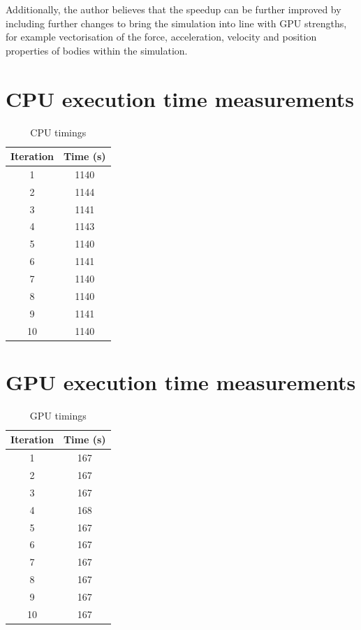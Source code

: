 \documentclass[journal,transmag]{IEEEtran}
\begin{document}
    Additionally, the author believes that the speedup can be further improved by including further changes to bring the
    simulation into line with GPU strengths, for example vectorisation of the force, acceleration, velocity and position
    properties of bodies within the simulation.

    \newpage

    \appendices
    \section{CPU execution time measurements}
    \begin{table}[h]
        \centering
        \caption{CPU timings}
        \label{CPUTableRaw}
        \begin{tabular}{ c c }
            Iteration & Time (s) \\
            \hline
            \hline
            1         & 1140 \\
            2         & 1144 \\
            3         & 1141 \\
            4         & 1143 \\
            5         & 1140 \\
            6         & 1141 \\
            7         & 1140 \\
            8         & 1140 \\
            9         & 1141 \\
            10        & 1140 \\
        \end{tabular}
    \end{table}

    \section{GPU execution time measurements}
     \begin{table}[h]
        \centering
        \caption{GPU timings}
        \label{GPUTableRaw}
        \begin{tabular}{ c c }
            Iteration & Time (s) \\
            \hline
            \hline
                1     & 167 \\
                2     & 167 \\
                3     & 167 \\
                4     & 168 \\
                5     & 167 \\
                6     & 167 \\
                7     & 167 \\
                8     & 167 \\
                9     & 167 \\
                10    & 167 \\
       \end{tabular}
    \end{table}
\end{document}
